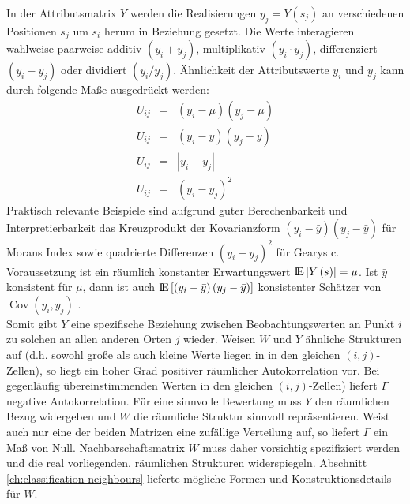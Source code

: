 In der Attributsmatrix $Y$ werden die Realisierungen $y_j=Y\left( s_j \right) $ an verschiedenen Positionen $s_j$ um $s_i$ herum in Beziehung gesetzt. 
Die Werte interagieren wahlweise paarweise additiv $\left(y_i+y_j\right)$, multiplikativ $\left(y_i \cdot y_j\right)$, 
differenziert $\left(y_i-y_j\right)$ oder dividiert $\left(y_i / y_j\right)$. \cite[S. 262]{fischer_handbook_2010}
Ähnlichkeit der Attributswerte $y_i$ und $y_j$ kann durch folgende Maße ausgedrückt werden:
\begin{eqnarray}
    U_{ij} & = &\left (y_i - \mu \right) \left( y_j-\mu \right) \\
    U_{ij} & = &\left( y_i-\bar{y} \right) \left( y_j-\bar{y} \right) \\
    U_{ij} & = &\left| y_i-y_j \right| \\
    U_{ij} & = &\left( y_i-y_j \right)^2
\end{eqnarray}
Praktisch relevante Beispiele sind aufgrund guter Berechenbarkeit und Interpretierbarkeit 
das Kreuzprodukt der Kovarianzform $\left( y_i-\bar{y} \right) \left( y_j-\bar{y} \right)$ für Morans Index 
sowie quadrierte Differenzen $\left( y_i-y_j \right)^2$ für Gearys c. 
Voraussetzung ist ein räumlich konstanter Erwartungswert $ {\rm I\!E}\left[Y\left(s\right)\right]=\mu$.
Ist $\bar{y}$ konsistent für $\mu$, dann ist auch ${\rm I\!E}\left[ \left(y_i-\bar{y}\right)\left(y_j-\bar{y}\right) \right]$ 
konsistenter Schätzer von $\operatorname{Cov} \left( y_i , y_j \right)$ 
\cite[S. 21]{schabenberger_statistical_2005}. \\    

Somit gibt $Y$ eine spezifische Beziehung zwischen Beobachtungswerten an Punkt $i$ zu solchen an allen anderen Orten $j$ wieder. 
Weisen $W$ und $Y$ ähnliche Strukturen auf (d.h. sowohl große als auch kleine Werte liegen in in den 
gleichen $\left(i,j\right)$-Zellen), so liegt ein hoher Grad positiver räumlicher Autokorrelation vor. 
Bei gegenläufig übereinstimmenden Werten in den gleichen $(i,j)$-Zellen) liefert $\Gamma$ negative Autokorrelation. 
Für eine sinnvolle Bewertung muss $Y$ den räumlichen Bezug widergeben und $W$ die räumliche Struktur sinnvoll repräsentieren. 
Weist auch nur eine der beiden Matrizen eine zufällige Verteilung auf, so liefert $\Gamma$ ein Maß von Null. 
Nachbarschaftsmatrix $W$ muss daher vorsichtig spezifiziert werden und die real vorliegenden, räumlichen Strukturen widerspiegeln. 
Abschnitt \ref{ch:classification-neighbours} lieferte mögliche Formen und Konstruktionsdetails für $W$. \cite[S.259]{fischer_handbook_2010} \\

